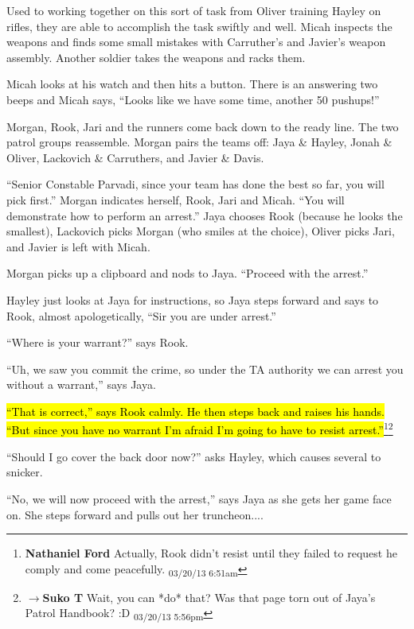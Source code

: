 Used to working together on this sort of task from Oliver training Hayley on rifles, they are able to accomplish the task swiftly and well.  Micah inspects the weapons and finds some small mistakes with Carruther's and Javier's weapon assembly.  Another soldier takes the weapons and racks them.



Micah looks at his watch and then hits a button.  There is an answering two beeps and Micah says, ``Looks like we have some time, another 50 pushups!''



Morgan, Rook, Jari and the runners come back down to the ready line.  The two patrol groups reassemble.   Morgan pairs the teams off: Jaya \& Hayley, Jonah \& Oliver, Lackovich \& Carruthers, and Javier \& Davis.

``Senior Constable Parvadi, since your team has done the best so far, you will pick first.''  Morgan indicates herself, Rook, Jari and Micah. ``You will demonstrate how to perform an arrest.''  Jaya chooses Rook (because he looks the smallest), Lackovich picks Morgan (who smiles at the choice), Oliver picks Jari, and Javier is left with Micah.



Morgan picks up a clipboard and nods to Jaya.  ``Proceed with the arrest.''



Hayley just looks at Jaya for instructions, so Jaya steps forward and says to Rook, almost apologetically, ``Sir you are under arrest.''

``Where is your warrant?'' says Rook.

``Uh, we saw you commit the crime, so under the TA authority we can arrest you without a warrant,'' says Jaya.

\hl{``That is correct,'' says Rook calmly.  He then steps back and raises his hands. ``But since you have no warrant I'm afraid I'm going to have to resist arrest.''}\footnote{\textbf{Nathaniel Ford }Actually, Rook didn't resist until they failed to request he comply and come peacefully. \textsubscript{03/20/13 6:51am}}\footnote{$\rightarrow$\textbf{Suko T }Wait, you can *do* that?  Was that page torn out of Jaya's Patrol Handbook? :D \textsubscript{03/20/13 5:56pm}}

``Should I go cover the back door now?'' asks Hayley, which causes several to snicker.

``No, we will now proceed with the arrest,'' says Jaya as she gets her game face on.  She steps forward and pulls out her truncheon....



